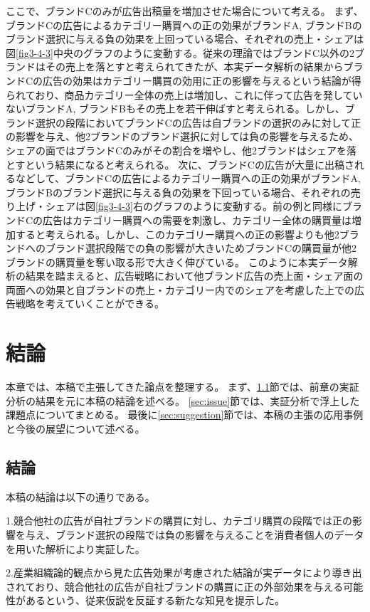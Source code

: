 \documentclass[11pt]{jsarticle}
\begin{document}
ここで、ブランドCのみが広告出稿量を増加させた場合について考える。
まず、ブランドCの広告によるカテゴリー購買への正の効果がブランドA, ブランドBのブランド選択に与える負の効果を上回っている場合、それぞれの売上・シェアは図\ref{fig3-4-3}中央のグラフのように変動する。従来の理論ではブランドC以外の2ブランドはその売上を落とすと考えられてきたが、本実データ解析の結果からブランドCの広告の効果はカテゴリー購買の効用に正の影響を与えるという結論が得られており、商品カテゴリー全体の売上は増加し、これに伴って広告を発していないブランドA, ブランドBもその売上を若干伸ばすと考えられる。しかし、ブランド選択の段階においてブランドCの広告は自ブランドの選択のみに対して正の影響を与え、他2ブランドのブランド選択に対しては負の影響を与えるため、シェアの面ではブランドCのみがその割合を増やし、他2ブランドはシェアを落とすという結果になると考えられる。
次に、ブランドCの広告が大量に出稿されるなどして、ブランドCの広告によるカテゴリー購買への正の効果がブランドA, ブランドBのブランド選択に与える負の効果を下回っている場合、それぞれの売り上げ・シェアは図\ref{fig3-4-3}右のグラフのように変動する。前の例と同様にブランドCの広告はカテゴリー購買への需要を刺激し、カテゴリー全体の購買量は増加すると考えられる。しかし、このカテゴリー購買への正の影響よりも他2ブランドへのブランド選択段階での負の影響が大きいためブランドCの購買量が他2ブランドの購買量を奪い取る形で大きく伸びている。
このように本実データ解析の結果を踏まえると、広告戦略において他ブランド広告の売上面・シェア面の両面への効果と自ブランドの売上・カテゴリー内でのシェアを考慮した上での広告戦略を考えていくことができる。

\section{結論}
\label{ch:conclusion}
本章では、本稿で主張してきた論点を整理する。
まず、\ref{sec:conclusion}節では、前章の実証分析の結果を元に本稿の結論を述べる。
\ref{sec:issue}節では、実証分析で浮上した課題点についてまとめる。
最後に\ref{sec:suggestion}節では、本稿の主張の応用事例と今後の展望について述べる。

\subsection{結論}
\label{sec:conclusion}
本稿の結論は以下の通りである。

1.競合他社の広告が自社ブランドの購買に対し、カテゴリ購買の段階では正の影響を与え、ブランド選択の段階では負の影響を与えることを消費者個人のデータを用いた解析により実証した。

2.産業組織論的観点から見た広告効果が考慮された結論が実データにより導き出されており、競合他社の広告が自社ブランドの購買に正の外部効果を与える可能性があるという、従来仮説を反証する新たな知見を提示した。
\end{document}
